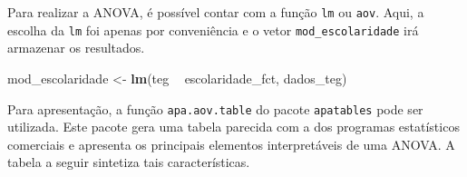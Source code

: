 \documentclass[
]{book}
\newenvironment{Shaded}{\begin{snugshade}}{\end{snugshade}}
\newcommand{\KeywordTok}[1]{\textcolor[rgb]{0.13,0.29,0.53}{\textbf{#1}}}
\newcommand{\NormalTok}[1]{#1}
\newcommand{\OperatorTok}[1]{\textcolor[rgb]{0.81,0.36,0.00}{\textbf{#1}}}
\newcommand{\StringTok}[1]{\textcolor[rgb]{0.31,0.60,0.02}{#1}}
\begin{document}
Para realizar a ANOVA, é possível contar com a função \texttt{lm} ou
\texttt{aov}. Aqui, a escolha da \texttt{lm} foi apenas por conveniência
e o vetor \texttt{mod\_escolaridade} irá armazenar os resultados.

\begin{Shaded}
\begin{Highlighting}[]
\NormalTok{mod_escolaridade <-}\StringTok{ }\KeywordTok{lm}\NormalTok{(teg }\OperatorTok{~}\StringTok{ }\NormalTok{escolaridade_fct, dados_teg)}
\end{Highlighting}
\end{Shaded}

Para apresentação, a função \texttt{apa.aov.table} do pacote
\texttt{apatables} pode ser utilizada. Este pacote gera uma tabela
parecida com a dos programas estatísticos comerciais e apresenta os
principais elementos interpretáveis de uma ANOVA. A tabela a seguir
sintetiza tais características.
\end{document}
